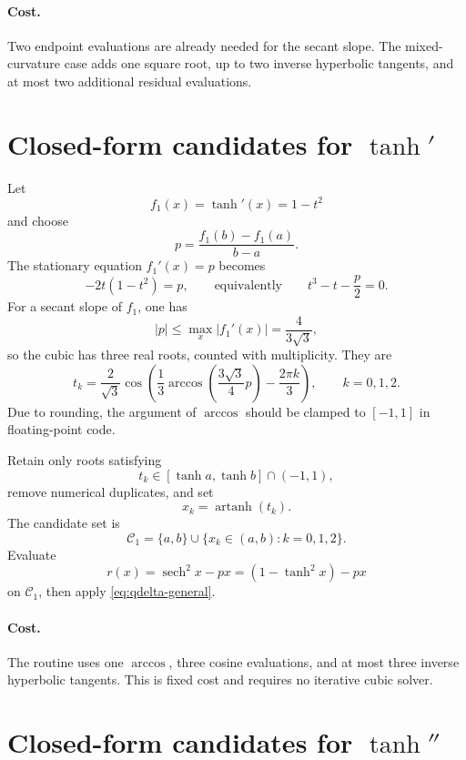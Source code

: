 \documentclass[11pt]{article}
\newcommand{\sech}{\operatorname{sech}}
\newcommand{\artanh}{\operatorname{artanh}}
\newcommand{\cand}{\mathcal{C}}
\begin{document}
\paragraph{Cost.}
Two endpoint evaluations are already needed for the secant slope. The mixed-curvature case adds one square root, up to two inverse hyperbolic tangents, and at most two additional residual evaluations.

\section{Closed-form candidates for \(\tanh'\)}

Let
\[
  f_1(x)=\tanh'(x)=1-t^2
\]
and choose
\begin{equation}\label{eq:p1}
  p=\frac{f_1(b)-f_1(a)}{b-a}.
\end{equation}
The stationary equation \(f_1'(x)=p\) becomes
\begin{equation}\label{eq:cubic}
  -2t(1-t^2)=p,
  \qquad\text{equivalently}\qquad
  t^3-t-\frac{p}{2}=0.
\end{equation}
For a secant slope of \(f_1\), one has
\[
  |p|\le \max_x|f_1'(x)|=\frac{4}{3\sqrt{3}},
\]
so the cubic has three real roots, counted with multiplicity. They are
\begin{equation}\label{eq:cubicroots}
  t_k=\frac{2}{\sqrt{3}}
  \cos\!\left(
    \frac{1}{3}\arccos\!\left(\frac{3\sqrt{3}}{4}p\right)
    -\frac{2\pi k}{3}
  \right),
  \qquad k=0,1,2.
\end{equation}
Due to rounding, the argument of \(\arccos\) should be clamped to \([-1,1]\) in floating-point code.

Retain only roots satisfying
\[
  t_k\in[\tanh a,\tanh b]\cap(-1,1),
\]
remove numerical duplicates, and set
\[
  x_k=\artanh(t_k).
\]
The candidate set is
\begin{equation}\label{eq:C1}
  \cand_1=\{a,b\}\cup\{x_k\in(a,b):k=0,1,2\}.
\end{equation}
Evaluate
\[
  r(x)=\sech^2x-px=(1-\tanh^2x)-px
\]
on \(\cand_1\), then apply \eqref{eq:qdelta-general}.

\paragraph{Cost.}
The routine uses one \(\arccos\), three cosine evaluations, and at most three inverse hyperbolic tangents. This is fixed cost and requires no iterative cubic solver.

\section{Closed-form candidates for \(\tanh''\)}
\end{document}
